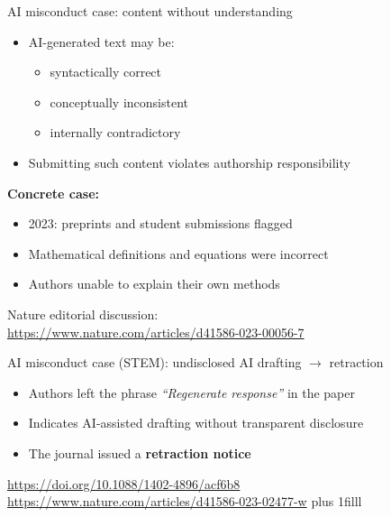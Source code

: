 \documentclass[aspectratio=169]{beamer}
\newcommand{\btVFill}{\vskip0pt plus 1filll}
\begin{document}
\begin{frame}{AI misconduct case: content without understanding}
  \begin{itemize}
    \item AI-generated text may be:
      \begin{itemize}
        \item syntactically correct
        \item conceptually inconsistent
        \item internally contradictory
      \end{itemize}
    \item Submitting such content violates authorship responsibility
  \end{itemize}

  \vspace{0.5em}
  \textbf{Concrete case:}
  \begin{itemize}
    \item 2023: preprints and student submissions flagged
    \item Mathematical definitions and equations were incorrect
    \item Authors unable to explain their own methods
  \end{itemize}

  \vspace{0.3em}
  \tiny
  Nature editorial discussion:\\
  \url{https://www.nature.com/articles/d41586-023-00056-7}
  \vspace{0.5em}
\end{frame}

\begin{frame}{AI misconduct case (STEM): undisclosed AI drafting $\rightarrow$ retraction}
  \begin{itemize}
    \item Authors left the phrase \emph{``Regenerate response''} in the paper
    \item Indicates AI-assisted drafting without transparent disclosure
    \item The journal issued a \textbf{retraction notice}
  \end{itemize}

  \vspace{0.5em}
  \tiny
  \url{https://doi.org/10.1088/1402-4896/acf6b8}\\
  \url{https://www.nature.com/articles/d41586-023-02477-w}
\btVFill
\end{frame}
\end{document}
